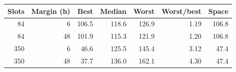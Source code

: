 \begin{tabular}{rrrrrrr}
\toprule
Slots & Margin (h) & Best & Median & Worst & Worst/best & Space \\
\midrule
84 & 6 & 106.5 & 118.6 & 126.9 & 1.19 & 106.8 \\
84 & 48 & 101.9 & 115.3 & 121.9 & 1.20 & 106.8 \\
350 & 6 & 46.6 & 125.5 & 145.4 & 3.12 & 47.4 \\
350 & 48 & 37.7 & 136.0 & 162.1 & 4.30 & 47.4 \\
\bottomrule
\end{tabular}
